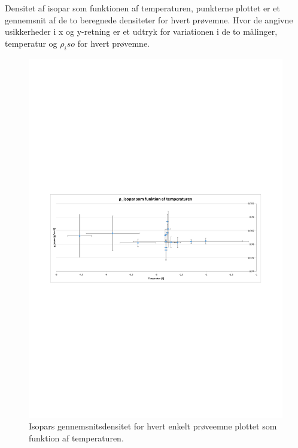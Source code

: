 \label{fig:iso_dens_plot}
Densitet af isopar som funktionen af temperaturen, punkterne plottet er et gennemsnit af de to beregnede densiteter for hvert prøvemne. Hvor de angivne usikkerheder i x og y-retning er et udtryk for variationen i de to målinger, temperatur og $\rho_iso$ for hvert prøvemne. 
\begin{landscape}
\begin{figure}[h]
\centering
\includegraphics[width=1.2\textwidth]{appendix/ny_tab_dens_plot}
\caption{Isopars gennemsnitsdensitet for hvert enkelt prøveemne plottet som funktion af temperaturen.}
\end{figure}
\end{landscape}